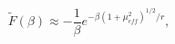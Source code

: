 \begin{equation}
\widetilde{F}\left(\beta \right)\approx -\frac{1}{\beta }e^{-\beta \left(1+\mu _{eff}^{2}\right)^{1/2}/r},\label{lowTfreeenergy}\end{equation}

